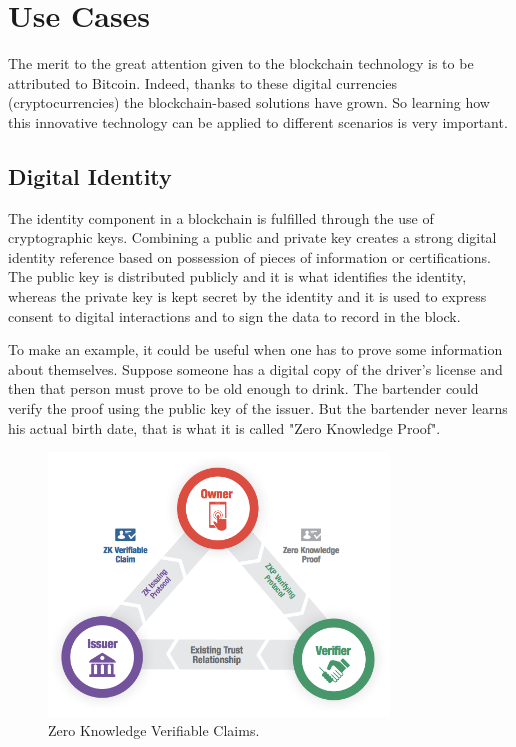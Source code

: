 \section{Use Cases}
\label{sec:usecases}

The merit to the great attention given to the blockchain technology is to be attributed
to Bitcoin. Indeed, thanks to these digital currencies (cryptocurrencies) the 
blockchain-based solutions have grown. So learning how this innovative technology
can be applied to different scenarios is very important. 

\subsection{Digital Identity}
\label{sec:identity}

The identity component in a blockchain is fulfilled through the use of cryptographic keys.
Combining a public and private key creates a strong digital identity reference based 
on possession of pieces of information or certifications. The public key is distributed 
publicly and it is what identifies the identity, whereas the private key is kept secret by
the identity and it is used to express consent to digital interactions and to 
sign the data to record in the block.\cite{coindesk}

To make an example, it could be useful when one has to prove some information 
about themselves. Suppose someone has a digital copy of the driver's license 
and then that person must prove to be old enough to drink. The bartender could verify
the proof using the public key of the issuer. But the bartender never learns his
actual birth date, that is what it is called "Zero Knowledge Proof".\cite{sovrin}

\begin{figure}[h]
    \centering
    \includegraphics[height=7cm]{identity.png}
    \caption{Zero Knowledge Verifiable Claims.\cite{sovrin}}
    \label{fig:claim}
\end{figure}\pagebreak

